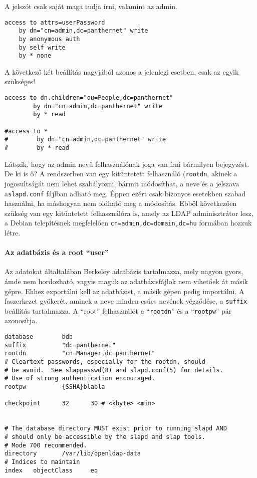 A jelszót csak saját maga tudja írni, valamint az admin.

\begin{Verbatim}
access to attrs=userPassword
    by dn="cn=admin,dc=panthernet" write
    by anonymous auth
    by self write
    by * none
\end{Verbatim}    

A következő két beállítás nagyjából azonos a jelenlegi esetben, csak az egyik szükséges!

\begin{Verbatim}
access to dn.children="ou=People,dc=panthernet"
        by dn="cn=admin,dc=panthernet" write
        by * read

#access to *
#        by dn="cn=admin,dc=panthernet" write
#        by * read
\end{Verbatim}


Látszik, hogy az admin nevű felhasználónak joga van írni bármilyen bejegyzést. De ki is ő? A rendszerben van egy
kitüntetett felhasználó (\texttt{rootdn}, akinek a jogosultságát nem lehet szabályozni, bármit módosíthat, a
neve és a jelszava a\texttt{slapd.conf} fájlban adható meg. Éppen ezért csak bizonyos esetekben szabad használni, ha
máshogyan nem oldható meg a módosítás. Ebből következően szükség van egy kitüntetett felhasználóra is, amely az LDAP
adminisztrátor lesz, a Debian telepítésnek megfelelően \texttt{cn=admin,dc=domain,dc=hu} formában hozzuk létre.


\paragraph{Az adatbázis és a root ``user''} Az adatokat általtalában Berkeley adatbázis tartalmazza, mely nagyon
gyors, ámde nem hordozható, vagyis maguk az adatbázisfájlok nem vihetőek át másik gépre. Ehhez exportálni kell az
adatbázist, a másik gépen pedig importálni. A faszerkezet gyökerét, aminek a neve minden csúcs nevének végződése, a
\texttt{suffix} beállítás tartalmazza. A ``root'' felhasználót a ``\texttt{rootdn}'' és a ``\texttt{rootpw}'' pár
azonosítja.

\begin{Verbatim}
database        bdb
suffix          "dc=panthernet"
rootdn          "cn=Manager,dc=panthernet"
# Cleartext passwords, especially for the rootdn, should
# be avoid.  See slappasswd(8) and slapd.conf(5) for details.
# Use of strong authentication encouraged.
rootpw          {SSHA}blabla

checkpoint      32      30 # <kbyte> <min>


# The database directory MUST exist prior to running slapd AND
# should only be accessible by the slapd and slap tools.
# Mode 700 recommended.
directory       /var/lib/openldap-data
# Indices to maintain
index   objectClass     eq
\end{Verbatim}

